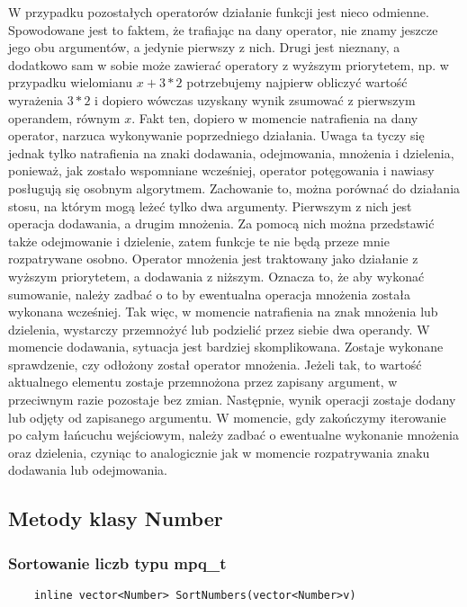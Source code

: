 \documentclass[oneside,a4paper]{book}
\begin{document}
	W przypadku pozostałych operatorów działanie funkcji jest nieco odmienne. Spowodowane jest to faktem, że trafiając na dany operator, nie znamy jeszcze jego obu argumentów, a jedynie pierwszy z nich. Drugi jest nieznany, a dodatkowo sam w sobie może zawierać operatory z wyższym priorytetem, np. w przypadku wielomianu $x+3*2$ potrzebujemy najpierw obliczyć wartość wyrażenia $3*2$ i dopiero wówczas uzyskany wynik zsumować z pierwszym operandem, równym $x$. Fakt ten, dopiero w momencie natrafienia na dany operator, narzuca wykonywanie poprzedniego działania. Uwaga ta tyczy się jednak tylko natrafienia na znaki dodawania, odejmowania, mnożenia i dzielenia, ponieważ, jak zostało wspomniane wcześniej, operator potęgowania i nawiasy posługują się osobnym algorytmem. Zachowanie to, można porównać do działania stosu, na którym mogą leżeć tylko dwa argumenty. Pierwszym z nich jest operacja dodawania, a drugim mnożenia. Za pomocą nich można przedstawić także odejmowanie i dzielenie, zatem funkcje te nie będą przeze mnie rozpatrywane osobno. Operator mnożenia jest traktowany jako działanie z wyższym priorytetem, a dodawania z niższym. Oznacza to, że aby wykonać sumowanie, należy zadbać o to by ewentualna operacja mnożenia została wykonana wcześniej. Tak więc, w momencie natrafienia na znak mnożenia lub dzielenia, wystarczy przemnożyć lub podzielić przez siebie dwa operandy. W momencie dodawania, sytuacja jest bardziej skomplikowana. Zostaje wykonane sprawdzenie, czy odłożony został operator mnożenia. Jeżeli tak, to wartość aktualnego elementu zostaje przemnożona przez zapisany argument, w przeciwnym razie pozostaje bez zmian. Następnie, wynik operacji zostaje dodany lub odjęty od zapisanego argumentu. W momencie, gdy zakończymy iterowanie po całym łańcuchu wejściowym, należy zadbać o ewentualne wykonanie mnożenia oraz dzielenia, czyniąc to analogicznie jak w momencie rozpatrywania znaku dodawania lub odejmowania.
	\\
	
	\subsection{Metody klasy Number}
	
	\subsubsection{Sortowanie liczb typu mpq\_t}
	\begin{lstlisting}
	inline vector<Number> SortNumbers(vector<Number>v)
	\end{lstlisting}
	
\end{document}
